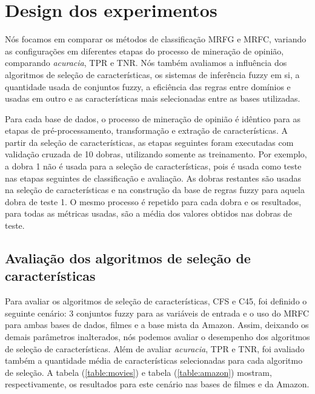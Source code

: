 \documentclass[template.tex]{subfiles}
\begin{document}
\section{Design dos experimentos}

Nós focamos em comparar os métodos de classificação MRFG e MRFC, variando as configurações em diferentes etapas do processo de mineração de opinião, comparando \textit{acuracia}, TPR e TNR. Nós também avaliamos a influência dos algoritmos de seleção de características, os sistemas de inferência fuzzy em si, a quantidade usada de conjuntos fuzzy, a eficiência das regras entre domínios e usadas em outro e as características mais selecionadas entre as bases utilizadas. 

Para cada base de dados, o processo de mineração de opinião é idêntico para as etapas de pré-processamento, transformação e extração de características. A partir da seleção de características, as etapas seguintes foram executadas com validação cruzada de 10 dobras, utilizando somente as treinamento. Por exemplo, a dobra 1 não é usada para a seleção de características, pois é usada como teste nas etapas seguintes de classificação e avaliação. As dobras restantes são usadas na seleção de características e na construção da base de regras fuzzy para aquela dobra de teste 1. O mesmo processo é repetido para cada dobra e os resultados, para todas as métricas usadas, são a média dos valores obtidos nas dobras de teste. 

\subsection{Avaliação dos algoritmos de seleção de características}

Para avaliar os algoritmos de seleção de características, CFS e C45, foi definido o seguinte cenário: 3 conjuntos fuzzy para as variáveis de entrada e o uso do MRFC para ambas bases de dados, filmes e a base mista da Amazon. Assim, deixando os demais parâmetros inalterados, nós podemos avaliar o desempenho dos algoritmos de seleção de características. Além de avaliar \textit{acuracia}, TPR e TNR, foi avaliado também a quantidade média de características selecionadas para cada algoritmo de seleção. A tabela (\ref{table:movies}) e tabela (\ref{table:amazon}) mostram, respectivamente, os resultados para este cenário nas bases de filmes e da Amazon. 
\end{document}
